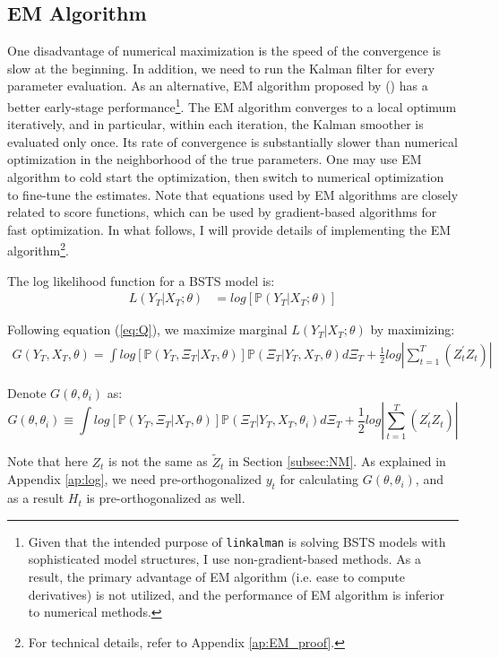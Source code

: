 \documentclass[10pt, titlepage]{article}
\numberwithin{equation}{section}
\begin{document}
\subsection{EM Algorithm} \label{subsec:EM}
One disadvantage of numerical maximization is the speed of the convergence is slow at the beginning. In addition, we need to run the Kalman filter for every parameter evaluation. As an alternative, EM algorithm proposed by (\cite{shumway_stoffer_1982}) has a better early-stage performance\footnote{Given that the intended purpose of \texttt{linkalman} is solving BSTS models with sophisticated model structures, I use non-gradient-based methods. As a result, the primary advantage of EM algorithm (i.e. ease to compute derivatives) is not utilized, and the performance of EM algorithm is inferior to numerical methods.}. The EM algorithm converges to a local optimum iteratively, and in particular, within each iteration, the Kalman smoother is evaluated only once. Its rate of convergence is substantially slower than numerical optimization in the neighborhood of the true parameters. One may use EM algorithm to cold start the optimization, then switch to numerical optimization to fine-tune the estimates. Note that equations used by EM algorithms are closely related to score functions, which can be used by gradient-based algorithms for fast optimization. In what follows, I will provide details of implementing the EM algorithm\footnote{For technical details, refer to Appendix \ref{ap:EM_proof}.}.  

The log likelihood function for a BSTS model is:
\begin{align*}
    L(Y_T|X_T; \theta) &= log[\mathbb{P}(Y_T|X_T;\theta)]
\end{align*}

Following equation (\ref{eq:Q}), we maximize marginal $L(Y_T|X_T;\theta)$ by maximizing: 
\begin{align*}
    G(Y_T,X_T,\theta) = \int log[\mathbb{P}(Y_T,\Xi_T|X_T,\theta)]\mathbb{P}(\Xi_T|Y_T,X_T,\theta)d\Xi_T + \frac{1}{2}log\left|\sum_{t=1}^{T}(Z_t^{'}Z_t)\right| 
\end{align*}

Denote $G(\theta,\theta_i)$ as: 
\[
    G(\theta,\theta_i) \equiv \int log[\mathbb{P}(Y_T,\Xi_T|X_T,\theta)]\mathbb{P}(\Xi_T|Y_T,X_T,\theta_i)d\Xi_T + \frac{1}{2}log\left|\sum_{t=1}^{T}(Z_t^{'}Z_t)\right| 
\]

Note that here $Z_t$ is not the same as $\tilde{Z}_t$ in Section \ref{subsec:NM}. As explained in Appendix \ref{ap:log}, we need pre-orthogonalized $y_t$ for calculating $G(\theta,\theta_i)$, and as a result $H_t$ is pre-orthogonalized as well. 
\end{document}
